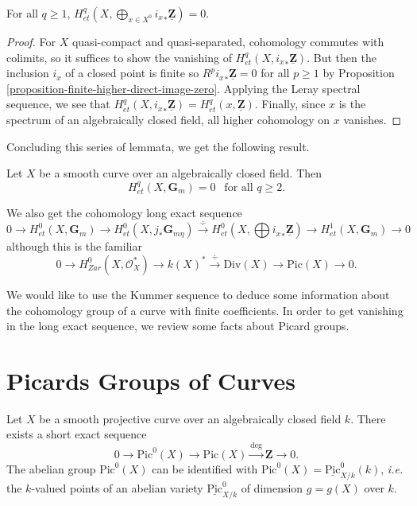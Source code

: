 \begin{lemma}
\label{lemma-cohomology-istar-Z}
For all $q \geq 1$, $H_{et}^q(X, \bigoplus_{x \in X^0} {i_x}_*
\underline{\mathbf{Z}}) = 0$.
\end{lemma}

\begin{proof}
For $X$ quasi-compact and quasi-separated, cohomology commutes with colimits,
so it suffices to show the vanishing of $H_{et}^q(X, {i_x}_*
\underline{\mathbf{Z}})$. But then the inclusion $i_x$ of a closed point is
finite so $R^p {i_x}_* \underline{\mathbf{Z}} = 0$ for all $p \geq 1$ by
Proposition \ref{proposition-finite-higher-direct-image-zero}.
Applying the Leray spectral sequence, we see that
$H_{et}^q(X, {i_x}_* \underline{\mathbf{Z}}) =
H_{et}^q(x, \underline{\mathbf{Z}})$.
Finally, since $x$ is the spectrum of an
algebraically closed field, all higher cohomology on $x$ vanishes.
\end{proof}

\noindent
Concluding this series of lemmata, we get the following result.

\begin{theorem}
\label{theorem-vanishing-cohomology-Gm-curve}
Let $X$ be a smooth curve over an algebraically closed field. Then
$$
H_{et}^q(X, \mathbf{G}_m) = 0 \ \ \text{ for all } q \geq 2.
$$
\end{theorem}

\noindent
We also get the cohomology long exact sequence
$$
0 \to H_{et}^0(X,\mathbf{G}_m) \to H_{et}^0(X,j_*\mathbf{G}_{m\eta})
\xrightarrow{\div} H_{et}^0(X,\bigoplus {i_x}_*\underline{\mathbf{Z}}) \to
H_{et}^1(X,\mathbf{G}_m) \to 0
$$
although this is the familiar
$$
0 \to H_{Zar}^0(X,\mathcal{O}_X^*) \to k(X)^* \xrightarrow{\div} \text{Div}(X)
\to \text{Pic}(X) \to 0.
$$

\medskip\noindent
We would like to use the Kummer sequence to deduce some information about the
cohomology group of a curve with finite coefficients. In order to get vanishing
in the long exact sequence, we review some facts about Picard groups.





\section{Picards Groups of Curves}
\label{section-pic-curves}

\noindent
Let $X$ be a smooth projective curve over an algebraically closed field $k$.
There exists a short exact sequence
$$
0\to \text{Pic}^0(X) \to \text{Pic}(X)\xrightarrow{\deg} \mathbf{Z} \to 0.
$$
The abelian group $\text{Pic}^0(X)$ can be identified with $\text{Pic}^0(X) =
\underline{\text{Pic}}^0_{X/k}(k)$, {\it i.e.} the $k$-valued points of an
abelian variety $\underline{\text{Pic}}^0_{X/k}$ of dimension $g=g(X)$ over
$k$.

